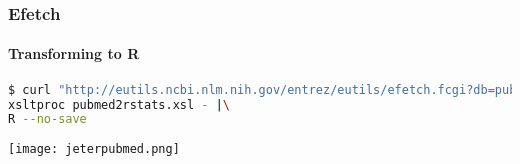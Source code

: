 \documentclass{beamer}
\begin{document}
\begin{frame}[fragile]
\frametitle{Efetch}
\framesubtitle{Transforming to R}

\begin{lstlisting}[language=bash,basicstyle=\tiny,breaklines=true,escapechar=\!]
$ curl "http://eutils.ncbi.nlm.nih.gov/entrez/eutils/efetch.fcgi?db=pubmed&usehistory=true&WebEnv=NCID_1_52434791_130.14.22.215_9001_1375957034_1619786167&query_key=1&retmode=xml" |\
xsltproc pubmed2rstats.xsl - |\
R --no-save
\end{lstlisting}

\begin{center}
\texttt{[image: jeterpubmed.png]}
\end{center}
\end{frame}
\end{document}
